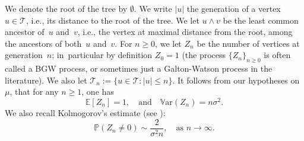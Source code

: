 \documentclass[11pt]{article}
\newcommand{\ie}{i.e.,\xspace}
\numberwithin{equation}{section}
\theoremstyle{plain}
\theoremstyle{definition}
\newcommand{\1}{{\text{\Large $\mathfrak 1$}}}
\begin{document}
We denote the root of the tree by $\emptyset$. We write $|u|$ the generation of a vertex $u\in \mathcal T$, \ie its distance to the root of the tree.
We let $u\wedge v$ be the least common ancestor of~$u$ and~$v$, \ie the vertex at maximal distance from the root, among the ancestors of
both~$u$ and~$v$. For $n\ge 0$, we let $Z_n$ be the number of vertices at generation~$n$; in~particular by definition $Z_0= 1$ (the process $\{Z_n\}_{n\ge 0}$ is often called a BGW process, or sometimes just a Galton-Watson process in the literature). We also let \hbox{$\mathcal T_n:=\{u\in \mathcal T:|u|\le n\}$}.
It follows from our hypotheses on $\mu$, that for any $n\ge 1$, one has
\begin{equation}\label{Zn}
\mathbb E[Z_n] = 1, \quad \text{and}\quad \mathbb V\text{ar}(Z_n) = n\sigma^2.
\end{equation}
We also recall Kolmogorov's estimate (see \cite[Th.\,1 p.\,19]{AN}):
\begin{equation}\label{Kol}
\mathbb P(Z_n\neq 0) \sim \frac{2}{\sigma^2 n }, \quad \text{as }n\to \infty.
\end{equation}
\end{document}
